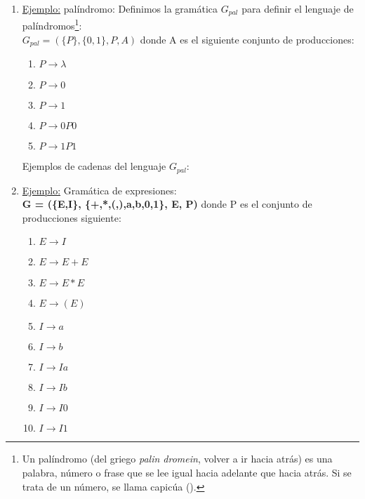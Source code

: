 \begin{enumerate}
\item \underline{Ejemplo:} palíndromo:
Definimos la gramática $G_{pal}$ para definir el lenguaje de palíndromos\footnote{Un palíndromo (del griego \textit{palin dromein}, volver a ir hacia atrás) es una palabra, número o frase que se lee igual hacia adelante que hacia atrás. Si se trata de un número, se llama capicúa ().}: \\
$G_{pal} = (\{P\},\{0,1\},P,A)$
donde A es el siguiente conjunto de producciones:
\begin{enumerate}
\item $P \rightarrow \lambda$
\item $P \rightarrow 0$
\item $P \rightarrow 1$
\item $P \rightarrow 0 P 0$
\item $P \rightarrow 1 P 1$
\end{enumerate}

Ejemplos de cadenas del lenguaje $G_{pal}$:

\item \underline{Ejemplo:} Gramática de expresiones:\\
\textbf{G = (\{E,I\}, \{+,*,(,),a,b,0,1\}, E, P)} donde P es el conjunto de producciones siguiente:
\begin{enumerate}
\item $E \rightarrow I$
\item $E \rightarrow E + E$
\item $E \rightarrow E * E$
\item $E \rightarrow (E)$
\item $I \rightarrow a$
\item $I \rightarrow b$
\item $I \rightarrow Ia$
\item $I \rightarrow Ib$
\item $I \rightarrow I0$
\item $I \rightarrow I1$
\end{enumerate}
\end{enumerate}

